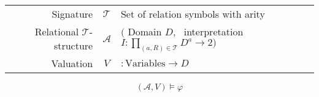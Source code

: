 \documentclass{article}
\begin{document}
	
	\bigskip
	
	\begin{tabular}{rcl}
		Signature & $\mathcal T$ & Set of relation symbols with arity\\
		Relational $\mathcal T$-structure & $\mathcal A$ & $\Big($ Domain $D$,~ interpretation $\displaystyle I : \prod_{(a,R) \in \mathcal T} D^a \to 2\Big)$ \\[-1.4ex]
		Valuation & $V$ & $ :\mathrm{Variables} \to D$
	\end{tabular}
\bigskip
	\[ (\mathcal A, V) \models \varphi \]
	
\end{document}
